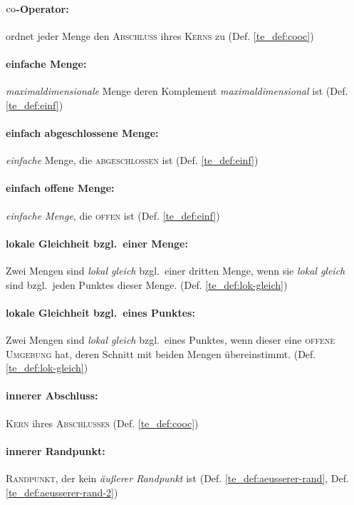     \paragraph{$\text{co}$-Operator:} ordnet jeder Menge den \textsc{Abschluss} ihres \textsc{Kerns} zu (Def. \ref{te_def:cooc})
    
    \paragraph{einfache Menge:} \textit{maximaldimensionale} Menge deren Komplement \textit{maximaldimensional} ist (Def. \ref{te_def:einf})
    
    \paragraph{einfach abgeschlossene Menge:} \textit{einfache} Menge, die \textsc{abgeschlossen} ist (Def. \ref{te_def:einf})
    
    \paragraph{einfach offene Menge:} \textit{einfache Menge}, die \textsc{offen} ist (Def. \ref{te_def:einf})
    
    \paragraph{lokale Gleichheit bzgl.\ einer Menge:} Zwei Mengen sind \textit{lokal gleich} bzgl.\ einer dritten Menge, wenn sie \textit{lokal gleich} sind bzgl.\ jeden Punktes dieser Menge. (Def. \ref{te_def:lok-gleich})

    \paragraph{lokale Gleichheit bzgl.\ eines Punktes:} Zwei Mengen sind \textit{lokal gleich} bzgl.\ eines Punktes, wenn dieser eine \textsc{offene Umgebung} hat, deren Schnitt mit beiden Mengen übereinstimmt. (Def. \ref{te_def:lok-gleich})
    
    \paragraph{innerer Abschluss:} \textsc{Kern} ihres \textsc{Abschlusses} (Def. \ref{te_def:cooc})
    
    \paragraph{innerer Randpunkt:} \textsc{Randpunkt}, der kein \textit{äußerer Randpunkt} ist (Def. \ref{te_def:aeusserer-rand}, Def. \ref{te_def:aeusserer-rand-2})
    
